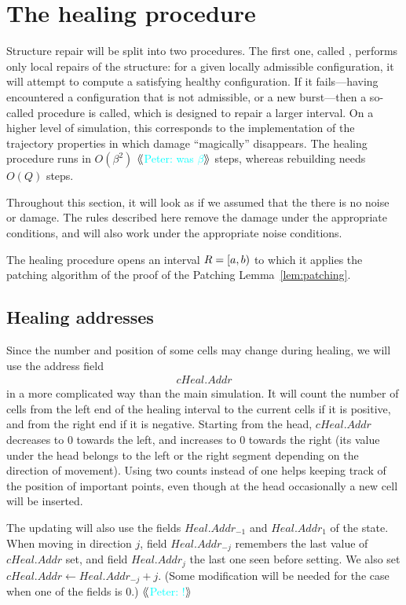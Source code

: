 \documentclass[12pt]{memoir}
\newcommand{\authnote}[3]
{{ \textcolor{#3}{\( \langle\hspace{-0.2em}\langle \)\textsf{\footnotesize #1: #2}\( \rangle\hspace{-0.2em}\rangle \)}}}
\newcommand{\authnote}[2]{}
\newcommand{\Pnote}[1]{{\authnote{Peter}{#1}{cyan}}}
\newcommand{\fld}[1]{\ensuremath{\textit{#1}}}
\newcommand{\R}{R}
\newcommand{\Addr}{\fld{Addr}}
\newcommand{\Heal}{\fld{Heal}}
\newcommand{\cHeal}{\fld{cHeal}}
\begin{document}
\section{The healing procedure}\label{sec:healing}

Structure repair will be split into two procedures.
The first one, called , performs
only local repairs of the structure: for a given locally admissible configuration,
it will attempt to compute a satisfying healthy configuration.
If it fails---having encountered a configuration that is not admissible, or
a new burst---then a so-called  procedure is called, which is designed
to repair a larger interval.
On a higher level of simulation, 
this corresponds to the implementation of the trajectory properties
in which damage ``magically'' disappears.
The healing procedure runs in \( O(\beta^{2}) \) \Pnote{was \( \beta \)}
steps, whereas rebuilding needs \( O(Q) \) steps.

Throughout this section, it will look as if we assumed that the there is no noise or damage.
The rules described here remove the damage under the 
appropriate conditions, and will also work under the appropriate noise conditions.

The healing procedure opens an interval \( \R = \lint{a}{b} \) to which it applies the
patching algorithm of the proof of the Patching Lemma~\ref{lem:patching}.

\subsection{Healing addresses}\label{sec:rec-addr}

Since the number and position of some cells may change during healing, 
we will use the address field
 \begin{align*}
 \cHeal.\Addr 
 \end{align*}
in a more complicated way than the main simulation.
It will count the number of cells 
from the left end of the healing interval to the current cells if it is positive,
and from the right end if it is negative.
Starting from the head, \( \cHeal.\Addr \) decreases to 0 towards the left, 
and increases to 0 towards the right (its value under the head belongs to
the left or the right segment depending on the direction of movement).
Using two counts instead of one helps keeping track of the position of important points,
even though at the head occasionally a new cell will be inserted.

The updating will also use the fields
\( \Heal.\Addr_{-1} \) and \( \Heal.\Addr_{1} \) of the state.
When moving in direction \( j \), field \( \Heal.\Addr_{-j} \) remembers the last
value of \( \cHeal.\Addr \) set, and field \( \Heal.\Addr_{j} \) the last one seen 
before setting.
We also set \( \cHeal.\Addr\gets\Heal.\Addr_{-j}+j \).
(Some modification will be needed for the case when one of the fields is 0.) \Pnote{!}
\end{document}
